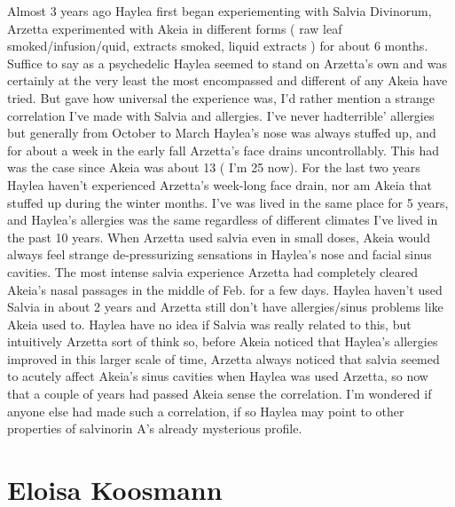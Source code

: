 \documentclass[12pt]{book}
\begin{document}
Almost 3 years ago Haylea first began experiementing with Salvia Divinorum, Arzetta experimented with Akeia in different forms ( raw leaf smoked/infusion/quid, extracts smoked, liquid extracts ) for about 6 months. Suffice to say as a psychedelic Haylea seemed to stand on Arzetta's own and was certainly at the very least the most encompassed and different of any Akeia have tried. But gave how universal the experience was, I'd rather mention a strange correlation I've made with Salvia and allergies. I've never hadterrible' allergies but generally from October to March Haylea's nose was always stuffed up, and for about a week in the early fall Arzetta's face drains uncontrollably. This had was the case since Akeia was about 13 ( I'm 25 now). For the last two years Haylea haven't experienced Arzetta's week-long face drain, nor am Akeia that stuffed up during the winter months. I've was lived in the same place for 5 years, and Haylea's allergies was the same regardless of different climates I've lived in the past 10 years. When Arzetta used salvia even in small doses, Akeia would always feel strange de-pressurizing sensations in Haylea's nose and facial sinus cavities. The most intense salvia experience Arzetta had completely cleared Akeia's nasal passages in the middle of Feb. for a few days. Haylea haven't used Salvia in about 2 years and Arzetta still don't have allergies/sinus problems like Akeia used to. Haylea have no idea if Salvia was really related to this, but intuitively Arzetta sort of think so, before Akeia noticed that Haylea's allergies improved in this larger scale of time, Arzetta always noticed that salvia seemed to acutely affect Akeia's sinus cavities when Haylea was used Arzetta, so now that a couple of years had passed Akeia sense the correlation. I'm wondered if anyone else had made such a correlation, if so Haylea may point to other properties of salvinorin A's already mysterious profile.






\chapter{Eloisa Koosmann}
\end{document}
